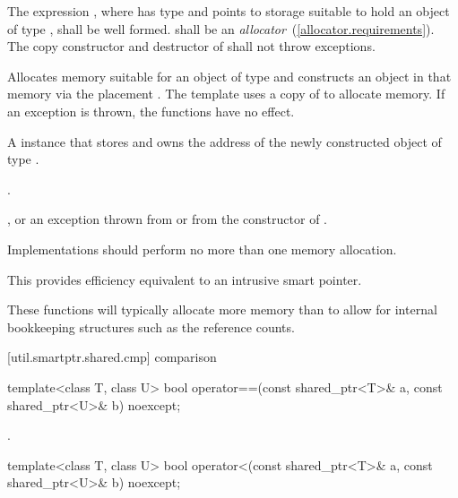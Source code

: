 \begin{itemdescr}
\pnum
\requires The expression ,
where  has type  and points to storage suitable
to hold an object of type , shall be well formed.  shall
be an \textit{allocator}~(\ref{allocator.requirements}). The copy constructor
and destructor of  shall not throw exceptions.

\pnum
\effects Allocates memory suitable for an object of type 
and constructs an object in that memory via the placement
.
The template  uses a copy of  to
allocate memory. If an exception is thrown, the functions have no effect.

\pnum
\returns A  instance that stores and owns
the address of the newly constructed object of type .

\pnum
\postconditions {}.

\pnum
\throws {}, or an exception thrown from
 or from the constructor of .

\pnum
\remarks Implementations should
perform no more than one memory allocation. \begin{note} This provides
efficiency equivalent to an intrusive smart pointer. \end{note}

\pnum
\begin{note} These functions will typically allocate more memory
than  to allow for internal bookkeeping structures such
as the reference counts. \end{note}
\end{itemdescr}

[util.smartptr.shared.cmp]{ comparison}

%
\begin{itemdecl}
template<class T, class U> bool operator==(const shared_ptr<T>& a, const shared_ptr<U>& b) noexcept;
\end{itemdecl}

\begin{itemdescr}
\pnum\returns  {}.
\end{itemdescr}

%
\begin{itemdecl}
template<class T, class U> bool operator<(const shared_ptr<T>& a, const shared_ptr<U>& b) noexcept;
\end{itemdecl}

